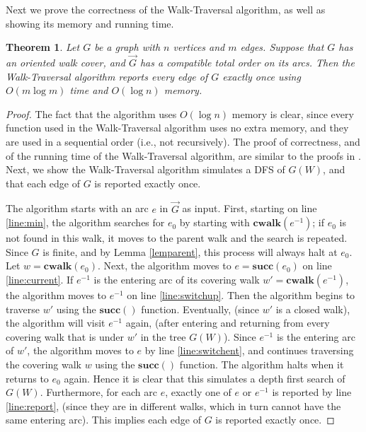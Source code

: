 \documentclass[12pt,letterpaper,oneside]{book}
\newcommand{\suc}{\textbf{succ}}
\newcommand{\cwalk}{\textbf{cwalk}}
\newtheorem{theorem}{Theorem}[section]
\begin{document}
Next we prove the correctness of the Walk-Traversal algorithm, as well as showing its memory and running time.  

\begin{theorem}\label{thmc}
Let $G$ be a graph with $n$ vertices and $m$ edges.  Suppose that $G$ has an oriented walk cover, and 
$\vec{G}$ has a compatible total order on its arcs.  
Then the Walk-Traversal algorithm reports every edge of $G$ exactly once 
using $O(m \log m)$ time and 
$O(\log n)$ memory. 
\end{theorem}

\begin{proof}

The fact that the algorithm uses $O(\log n)$ memory is clear, since every function used 
in the Walk-Traversal algorithm uses no extra memory, and they are used in a sequential order (i.e., not recursively).  The proof 
of correctness, and of the running time of the Walk-Traversal algorithm, are similar to the proofs in \cite{BM}.  
Next, we show the Walk-Traversal algorithm simulates a DFS of $G(W)$, and that each edge of $G$ is reported exactly once.  




The algorithm starts with an arc $e$ in $\vec{G}$ as input.  
First, starting on line \ref{line:min}, the algorithm searches for $e_0$ by starting with $\cwalk(e^{-1})$; if $e_0$ is not found 
in this walk, it moves 
to the parent walk and the search is repeated.  
Since $G$ is finite, and by Lemma \ref{lemparent}, this process will always halt at $e_0$.  Let $w=\cwalk(e_0)$.  
Next, the algorithm moves 
to $e=\suc(e_0)$ on line \ref{line:current}.    
If $e^{-1}$ is the entering arc of its covering walk 
$w'=\cwalk(e^{-1})$, the algorithm moves to $e^{-1}$ on line 
\ref{line:switchup}.  Then the algorithm begins to traverse $w'$ using the $\suc()$ function.  Eventually, (since 
$w'$ is a closed walk), the algorithm will visit $e^{-1}$ 
again, (after entering and returning from every covering 
walk that is under $w'$ in the tree $G(W)$).  Since $e^{-1}$ is the entering arc of $w'$, the algorithm moves 
to $e$ by line \ref{line:switchent}, and continues traversing the covering walk $w$ using the $\suc()$ function.  
The algorithm halts when it returns to $e_0$ again.   
Hence it is clear that this simulates a depth first search of $G(W)$.  Furthermore, for each arc $e$, 
exactly one of $e$ or $e^{-1}$ is reported by line \ref{line:report}, (since they are in different walks, which in turn cannot have 
the same entering arc).  This implies each edge of $G$ is reported exactly once.  




\end{proof}
\end{document}
